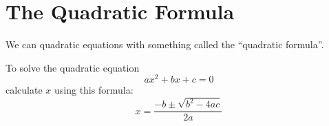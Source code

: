 \section*{The Quadratic Formula}

We can  quadratic equations with something called
the ``quadratic formula''.

\begin{center}
\begin{tcolorbox}[width=5.5in]
    To solve the quadratic equation
    {\LARGE
        \[
            a x^2 + bx + c = 0
        \]
    }
    calculate $x$ using this formula:
    {\LARGE
        \[
            x = \frac
                {-b \pm \sqrt{b^2 - 4ac}}
                {2a}
        \]
    }
\end{tcolorbox}
\end{center}

